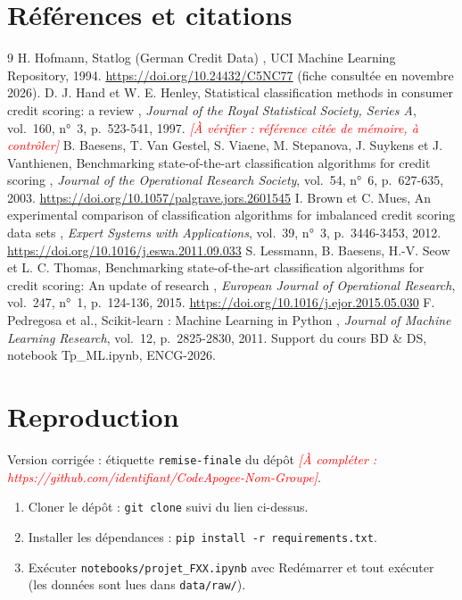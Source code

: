 \documentclass[12pt,a4paper]{article}
\newcommand{\todo}[1]{\textcolor{red}{\textit{[À compléter : #1]}}}
\newcommand{\verif}[1]{\textcolor{red}{\textit{[À vérifier : #1]}}}
\begin{document}
\section*{Références et citations}
{\renewcommand{\section}[2]{}%
\begin{thebibliography}{9}
 H. Hofmann, \og Statlog (German Credit Data) \fg{}, UCI Machine Learning Repository, 1994. \url{https://doi.org/10.24432/C5NC77} (fiche consultée en novembre 2026).
 D. J. Hand et W. E. Henley, \og Statistical classification methods in consumer credit scoring: a review \fg{}, \emph{Journal of the Royal Statistical Society, Series A}, vol.~160, n°~3, p.~523-541, 1997. \verif{référence citée de mémoire, à contrôler}
 B. Baesens, T. Van Gestel, S. Viaene, M. Stepanova, J. Suykens et J. Vanthienen, \og Benchmarking state-of-the-art classification algorithms for credit scoring \fg{}, \emph{Journal of the Operational Research Society}, vol.~54, n°~6, p.~627-635, 2003. \url{https://doi.org/10.1057/palgrave.jors.2601545}
 I. Brown et C. Mues, \og An experimental comparison of classification algorithms for imbalanced credit scoring data sets \fg{}, \emph{Expert Systems with Applications}, vol.~39, n°~3, p.~3446-3453, 2012. \url{https://doi.org/10.1016/j.eswa.2011.09.033}
 S. Lessmann, B. Baesens, H.-V. Seow et L. C. Thomas, \og Benchmarking state-of-the-art classification algorithms for credit scoring: An update of research \fg{}, \emph{European Journal of Operational Research}, vol.~247, n°~1, p.~124-136, 2015. \url{https://doi.org/10.1016/j.ejor.2015.05.030}
 F. Pedregosa et al., \og Scikit-learn : Machine Learning in Python \fg{}, \emph{Journal of Machine Learning Research}, vol.~12, p.~2825-2830, 2011.
 Support du cours BD \& DS, notebook Tp\_ML.ipynb, ENCG-2026.
\end{thebibliography}}

\appendix
\section{Reproduction}
Version corrigée : étiquette \texttt{remise-finale} du dépôt \todo{https://github.com/identifiant/CodeApogee-Nom-Groupe}.
\begin{enumerate}
\item Cloner le dépôt : \texttt{git clone} suivi du lien ci-dessus.
\item Installer les dépendances : \texttt{pip install -r requirements.txt}.
\item Exécuter \texttt{notebooks/projet\_FXX.ipynb} avec \og Redémarrer et tout exécuter \fg{} (les données sont lues dans \texttt{data/raw/}).
\end{enumerate}
\end{document}
